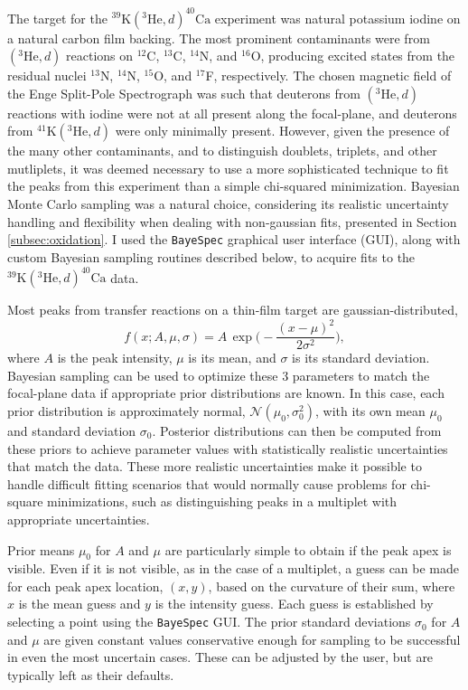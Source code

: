 The target for the $^{39}\mathrm{K}(^{3}\mathrm{He}, d)^{40}\mathrm{Ca}$ experiment was natural potassium iodine on a natural carbon film backing. The most prominent contaminants were from $(^{3}\mathrm{He}, d)$ reactions on $^{12}$C, $^{13}$C, $^{14}$N, and $^{16}$O, producing excited states from the residual nuclei $^{13}$N, $^{14}$N, $^{15}$O, and $^{17}$F, respectively. The chosen magnetic field of the Enge Split-Pole Spectrograph was such that deuterons from $(^{3}\mathrm{He}, d)$ reactions with iodine were not at all present along the focal-plane, and deuterons from $^{41}\mathrm{K}(^{3}\mathrm{He}, d)$ were only minimally present. However, given the presence of the many other contaminants, and to distinguish doublets, triplets, and other mutliplets, it was deemed necessary to use a more sophisticated technique to fit the peaks from this experiment than a simple chi-squared minimization. Bayesian Monte Carlo sampling was a natural choice, considering its realistic uncertainty handling and flexibility when dealing with non-gaussian fits, presented in Section \ref{subsec:oxidation}. I used the \texttt{BayeSpec} \cite{BayeSpec} graphical user interface (GUI), along with custom Bayesian sampling routines described below, to acquire fits to the $^{39}\mathrm{K}(^{3}\mathrm{He}, d)^{40}\mathrm{Ca}$ data.

Most peaks from transfer reactions on a thin-film target are gaussian-distributed,
\begin{equation}
    f(x;A,\mu,\sigma) = A \, \exp \Big( -\frac{(x-\mu)^{2}}{2\sigma^{2}} \Big),
\end{equation}
where $A$ is the peak intensity, $\mu$ is its mean, and $\sigma$ is its standard deviation.
Bayesian sampling can be used to optimize these 3 parameters to match the focal-plane data if appropriate prior distributions are known. In this case, each prior distribution is approximately normal, $\mathcal{N}(\mu_{0},\sigma_{0}^{2})$, with its own mean $\mu_{0}$ and standard deviation $\sigma_{0}$. Posterior distributions can then be computed from these priors to achieve parameter values with statistically realistic uncertainties that match the data. These more realistic uncertainties make it possible to handle difficult fitting scenarios that would normally cause problems for chi-square minimizations, such as distinguishing peaks in a multiplet with appropriate uncertainties.

Prior means $\mu_{0}$ for $A$ and $\mu$ are particularly simple to obtain if the peak apex is visible. Even if it is not visible, as in the case of a multiplet, a guess can be made for each peak apex location, $(x,y)$, based on the curvature of their sum, where $x$ is the mean guess and $y$ is the intensity guess. Each guess is established by selecting a point using the \texttt{BayeSpec} GUI. The prior standard deviations $\sigma_{0}$ for $A$ and $\mu$ are given constant values conservative enough for sampling to be successful in even the most uncertain cases. These can be adjusted by the user, but are typically left as their defaults.

